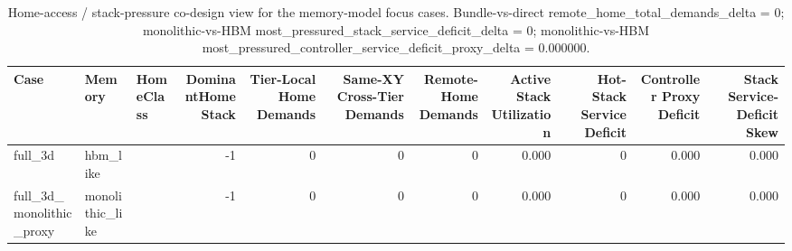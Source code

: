 \begin{table}[t]
  \centering
  \caption{Home-access / stack-pressure co-design view for the memory-model focus cases. Bundle-vs-direct remote\_home\_total\_demands\_delta = 0; monolithic-vs-HBM most\_pressured\_stack\_service\_deficit\_delta = 0; monolithic-vs-HBM most\_pressured\_controller\_service\_deficit\_proxy\_delta = 0.000000.}
  \begin{tabular}{l l l r r r r r r r r}
  \hline
  Case & Memory & HomeClass & DominantHomeStack & Tier-Local Home Demands & Same-XY Cross-Tier Demands & Remote-Home Demands & Active Stack Utilization & Hot-Stack Service Deficit & Controller Proxy Deficit & Stack Service-Deficit Skew \\
  \hline
  full\_3d & hbm\_like &  & -1 & 0 & 0 & 0 & 0.000 & 0 & 0.000 & 0.000 \\
  full\_3d\_monolithic\_proxy & monolithic\_like &  & -1 & 0 & 0 & 0 & 0.000 & 0 & 0.000 & 0.000 \\
  \hline
  \end{tabular}
\end{table}
